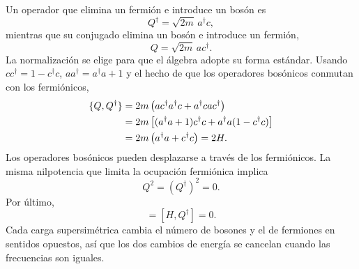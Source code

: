 Un operador que elimina un fermión e introduce un bosón es
\begin{equation}
Q^\dagger=\sqrt{2m}\,a^\dagger c,
\end{equation}
mientras que su conjugado elimina un bosón e introduce un fermión,
\begin{equation}
Q=\sqrt{2m}\,a c^\dagger.
\end{equation}
La normalización se elige para que el álgebra adopte su forma estándar. Usando \(cc^\dagger=1-c^\dagger c\), \(aa^\dagger=a^\dagger a+1\) y el hecho de que los operadores bosónicos conmutan con los fermiónicos,
\begin{align}
\{Q,Q^\dagger\}
&=2m\left(ac^\dagger a^\dagger c+a^\dagger c a c^\dagger\right)\notag\\
&=2m\left[(a^\dagger a+1)c^\dagger c
+a^\dagger a(1-c^\dagger c)\right]\notag\\
&=2m\left(a^\dagger a+c^\dagger c\right)=2H.
\label{eq:l7-superalgebra}
\end{align}
Los operadores bosónicos pueden desplazarse a través de los fermiónicos. La misma nilpotencia que limita la ocupación fermiónica implica
\begin{equation}
Q^2=(Q^\dagger)^2=0.
\end{equation}
Por último,
\begin{equation}
[H,Q]=[H,Q^\dagger]=0.
\label{eq:l7-conserved-supercharges}
\end{equation}
Cada carga supersimétrica cambia el número de bosones y el de fermiones en sentidos opuestos, así que los dos cambios de energía se cancelan cuando las frecuencias son iguales.

\begin{classroomqa}
\end{classroomqa}

\begin{classroomqa}
\end{classroomqa}

